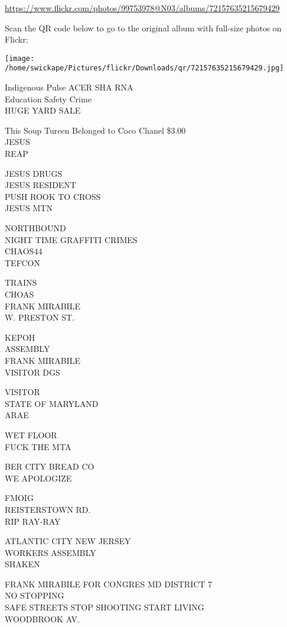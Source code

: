 \documentclass[10pt,letterpaper]{article}
\begin{document}
\url{https://www.flickr.com/photos/99753978@N03/albums/72157635215679429}

Scan the QR code below to go to the original album with full-size photos on Flickr:

\texttt{[image: /home/swickape/Pictures/flickr/Downloads/qr/72157635215679429.jpg]}
\pagebreak

Indigenous Pulse ACER SHA RNA\\
Education Safety Crime\\
HUGE YARD SALE

This Soup Tureen Belonged to Coco Chanel \$3.00\\
JESUS\\
REAP

JESUS DRUGS\\
JESUS RESIDENT\\
PUSH ROOK TO CROSS\\
JESUS MTN

NORTHBOUND\\
NIGHT TIME GRAFFITI CRIMES\\
CHAOS44\\
TEFCON

TRAINS\\
CHOAS\\
FRANK MIRABILE\\
W. PRESTON ST.

KEPOH\\
ASSEMBLY\\
FRANK MIRABILE\\
VISITOR DGS

VISITOR\\
STATE OF MARYLAND\\
ARAE

WET FLOOR\\
FUCK THE MTA

BER CITY BREAD CO\\
WE APOLOGIZE

FMOIG\\
REISTERSTOWN RD.\\
RIP RAY{-}RAY

ATLANTIC CITY NEW JERSEY\\
WORKERS ASSEMBLY\\
SHAKEN

FRANK MIRABILE FOR CONGRES MD DISTRICT 7\\
NO STOPPING\\
SAFE STREETS STOP SHOOTING START LIVING\\
WOODBROOK AV.
\end{document}
